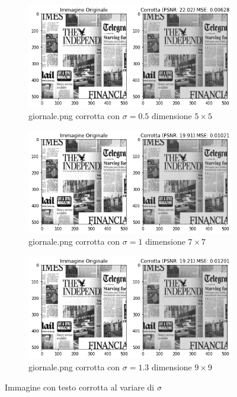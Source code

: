 \begin{figure}[H]
    \centering
    \begin{subfigure}{0.6\textwidth}
        \centering
        \includegraphics[width=\textwidth]{imgRel/testocorrotto/testocorrotto5x5.png}
        \caption{giornale.png corrotta con $\sigma = 0.5$ dimensione $5 \times 5$}
        \label{fig: giornalecorrotto5}
    \end{subfigure}
    \begin{subfigure}{0.6\textwidth}
        \centering
        \includegraphics[width=\textwidth]{imgRel/testocorrotto/testocorrotto7x7.png}
        \caption{giornale.png corrotta con $\sigma = 1$ dimensione $7 \times 7$}
        \label{fig: giornalecorrotto7}
    \end{subfigure}
    \begin{subfigure}{0.6\textwidth}
        \centering
        \includegraphics[width=\textwidth]{imgRel/testocorrotto/testocorrotto9x9.png}
        \caption{giornale.png corrotta con $\sigma = 1.3$ dimensione $9 \times 9$}
        \label{fig: giornalecorrotto9}
    \end{subfigure}
    \caption{Immagine con testo corrotta al variare di $\sigma$}
    \label{fig: GiornaleCorrotto}
\end{figure}